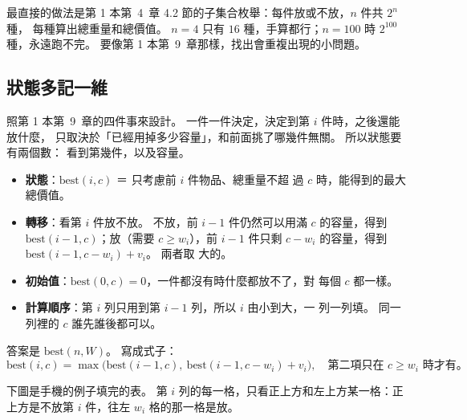 最直接的做法是第 1 本第~4~章 4.2 節的子集合枚舉：每件放或不放，$n$ 件共 $2^n$ 種，
每種算出總重量和總價值。 $n = 4$ 只有 $16$ 種，手算都行；$n = 100$ 時
$2^{100}$ 種，永遠跑不完。 要像第 1 本第~9~章那樣，找出會重複出現的小問題。

\subsection{狀態多記一維}

照第 1 本第~9~章的四件事來設計。 一件一件決定，決定到第 $i$ 件時，之後還能放什麼，
只取決於「已經用掉多少容量」，和前面挑了哪幾件無關。 所以狀態要有兩個數：
看到第幾件，以及容量。

\begin{itemize}
\item \textbf{狀態}：$\mathrm{best}(i, c)$ ＝ 只考慮前 $i$ 件物品、總重量不超
過 $c$ 時，能得到的最大總價值。
\item \textbf{轉移}：看第 $i$ 件放不放。 不放，前 $i - 1$ 件仍然可以用滿 $c$
的容量，得到 $\mathrm{best}(i - 1, c)$；放（需要 $c \ge w_i$），前 $i - 1$
件只剩 $c - w_i$ 的容量，得到 $\mathrm{best}(i - 1, c - w_i) + v_i$。 兩者取
大的。
\item \textbf{初始值}：$\mathrm{best}(0, c) = 0$，一件都沒有時什麼都放不了，對
每個 $c$ 都一樣。
\item \textbf{計算順序}：第 $i$ 列只用到第 $i - 1$ 列，所以 $i$ 由小到大，一
列一列填。 同一列裡的 $c$ 誰先誰後都可以。
\end{itemize}

答案是 $\mathrm{best}(n, W)$。 寫成式子：
\[
\mathrm{best}(i, c) = \max\bigl(\mathrm{best}(i - 1, c),\ \mathrm{best}(i - 1, c - w_i) + v_i\bigr),
\quad \text{第二項只在 } c \ge w_i \text{ 時才有。}
\]

下圖是手機的例子填完的表。 第 $i$ 列的每一格，只看正上方和左上方某一格：正
上方是不放第 $i$ 件，往左 $w_i$ 格的那一格是放。

